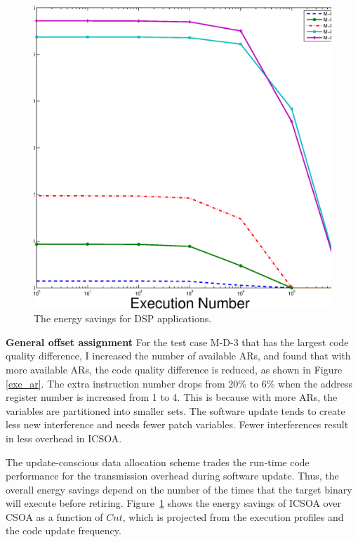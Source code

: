 \begin{figure}[htbp]
\begin{center}
\includegraphics[scale=0.4]{./figures/da-energy.eps}
\caption{The energy savings for DSP applications.}
\label{energy-dsp}
\end{center}
\end{figure}
\textbf{General offset assignment} For the test case M-D-3 that has the largest code quality difference, I increased 
the number of available ARs, and found that with more available ARs, the code quality difference is reduced, as shown 
in Figure \ref{exe_ar}. The extra instruction number drops from 20\% to 6\% when the address register number is 
increased from 1 to 4. 
This is because with more ARs, the variables are partitioned into smaller sets. The software update tends to create 
less new interference and needs fewer patch variables. Fewer interferences result in less overhead in ICSOA. 



The update-conscious data allocation scheme trades the run-time code performance for the transmission overhead during 
software update. Thus, the overall energy savings depend on the number of the times that the target binary will execute 
before retiring. Figure~\ref{energy-dsp} shows the energy savings of ICSOA over CSOA as a function of 
$Cnt$, which is projected from the execution profiles and the code update frequency.



